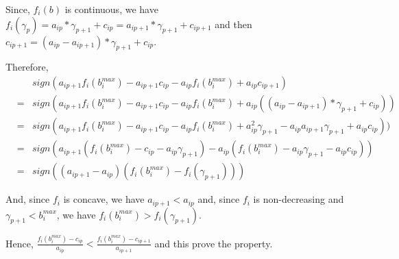 \documentclass{article}
\begin{document}
Since, $f_i(b)$ is continuous, we have $f_i(\gamma_{p})=a_{ip}*\gamma_{p+1}+c_{ip}=
a_{ip+1}*\gamma_{p+1}+c_{ip+1}$ and then $c_{ip+1}=
(a_{ip}-a_{ip+1})*\gamma_{p+1}+c_{ip}$. 

Therefore,
\begin{align*}
 & & sign(a_{ip+1}f_i(b_i^{max}) - a_{ip+1}c_{ip}-a_{ip}f_i(b_i^{max}) + a_{ip}c_{ip+1})\\
 &=& sign(a_{ip+1}f_i(b_i^{max}) - a_{ip+1}c_{ip}-a_{ip}f_i(b_i^{max}) + a_{ip}((a_{ip}-a_{ip+1})*\gamma_{p+1}+c_{ip}))\\
 &=& sign(a_{ip+1}f_i(b_i^{max}) - a_{ip+1}c_{ip}-a_{ip}f_i(b_i^{max}) + a_{ip}^2\gamma_{p+1}-a_{ip}a_{ip+1}\gamma_{p+1}+a_{ip}c_{ip}))\\
 &=& sign(a_{ip+1}(f_i(b_i^{max}) -c_{ip}-a_{ip}\gamma_{p+1})-a_{ip}(f_i(b_i^{max}) - a_{ip}\gamma_{p+1}-a_{ip}c_{ip}))\\
 &=& sign((a_{ip+1}-a_{ip})(f_i(b_i^{max})-f_i(\gamma_{p+1})))
 \end{align*}
 
And, since $f_i$ is concave, we have $a_{ip+1}<a_{ip}$ and, since $f_i$ is 
non-decreasing and $\gamma_{p+1}< b_i^{max}$, we have $f_i(b_i^{max})>
f_i(\gamma_{p+1})$. 

Hence, $\frac{f_i(b_i^{max}) - c_{ip}}{a_{ip}} < 
\frac{f_i(b_i^{max}) - c_{ip+1}}{a_{ip+1}}$ and this prove the property.
\end{document}
